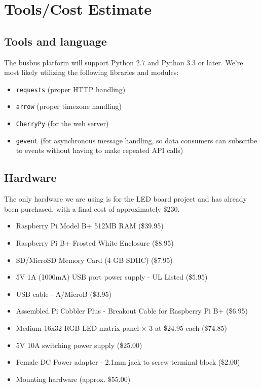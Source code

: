 \documentclass[12pt]{article}
\begin{document}
\section{Tools/Cost Estimate}
\subsection{Tools and language}
The busbus platform will support Python 2.7 and Python 3.3 or later. We're most likely utilizing the following
libraries and modules:
\begin{itemize}
	\item \texttt{requests} (proper HTTP handling)
	\item \texttt{arrow} (proper timezone handling)
	\item \texttt{CherryPy} (for the web server)
	\item \texttt{gevent} (for asynchronous message handling, so data consumers can subscribe to events
		without having to make repeated API calls)
\end{itemize}

\subsection{Hardware}
The only hardware we are using is for the LED board project and has already been purchased, with a final cost of approximately \$230.
\begin{itemize}
\item Raspberry Pi Model B+ 512MB RAM (\$39.95)
\item Raspberry Pi B+ Frosted White Enclosure (\$8.95)
\item SD/MicroSD Memory Card (4 GB SDHC) (\$7.95)
\item 5V 1A (1000mA) USB port power supply - UL Listed (\$5.95)
\item USB cable - A/MicroB (\$3.95)
\item Assembled Pi Cobbler Plus - Breakout Cable for Raspberry Pi B+ (\$6.95)
\item Medium 16x32 RGB LED matrix panel × 3 at \$24.95 each (\$74.85)
\item 5V 10A switching power supply (\$25.00)
\item Female DC Power adapter - 2.1mm jack to screw terminal block (\$2.00)
\item Mounting hardware (approx. \$55.00)
\end{itemize}

\pagebreak
\end{document}
